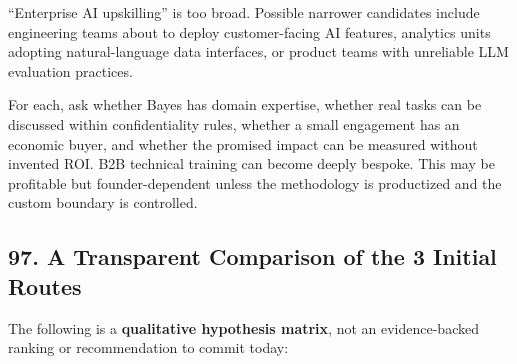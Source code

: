 ``Enterprise AI upskilling'' is too broad. Possible narrower candidates include engineering teams about to deploy customer-facing AI features, analytics units adopting natural-language data interfaces, or product teams with unreliable LLM evaluation practices.

For each, ask whether Bayes has domain expertise, whether real tasks can be discussed within confidentiality rules, whether a small engagement has an economic buyer, and whether the promised impact can be measured without invented ROI. B2B technical training can become deeply bespoke. This may be profitable but founder-dependent unless the methodology is productized and the custom boundary is controlled.

\subsection*{97. A Transparent Comparison of the 3 Initial Routes}

The following is a \textbf{qualitative hypothesis matrix}, not an evidence-backed ranking or recommendation to commit today:

